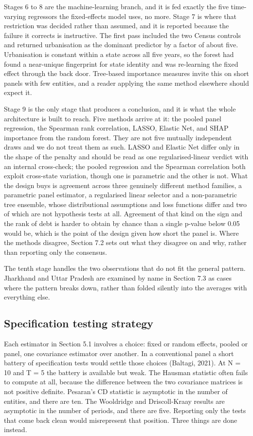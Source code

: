 \documentclass[12pt,a4paper]{article}
\begin{document}
Stages 6 to 8 are the machine-learning branch, and it is fed exactly the five time-varying regressors the fixed-effects model uses, no more. Stage 7 is where that restriction was decided rather than assumed, and it is reported because the failure it corrects is instructive. The first pass included the two Census controls and returned urbanisation as the dominant predictor by a factor of about five. Urbanisation is constant within a state across all five years, so the forest had found a near-unique fingerprint for state identity and was re-learning the fixed effect through the back door. Tree-based importance measures invite this on short panels with few entities, and a reader applying the same method elsewhere should expect it.

Stage 9 is the only stage that produces a conclusion, and it is what the whole architecture is built to reach. Five methods arrive at it: the pooled panel regression, the Spearman rank correlation, LASSO, Elastic Net, and SHAP importance from the random forest. They are not five mutually independent draws and we do not treat them as such. LASSO and Elastic Net differ only in the shape of the penalty and should be read as one regularised-linear verdict with an internal cross-check; the pooled regression and the Spearman correlation both exploit cross-state variation, though one is parametric and the other is not. What the design buys is agreement across three genuinely different method families, a parametric panel estimator, a regularised linear selector and a non-parametric tree ensemble, whose distributional assumptions and loss functions differ and two of which are not hypothesis tests at all. Agreement of that kind on the sign and the rank of debt is harder to obtain by chance than a single p-value below 0.05 would be, which is the point of the design given how short the panel is. Where the methods disagree, Section 7.2 sets out what they disagree on and why, rather than reporting only the consensus.

The tenth stage handles the two observations that do not fit the general pattern. Jharkhand and Uttar Pradesh are examined by name in Section 7.3 as cases where the pattern breaks down, rather than folded silently into the averages with everything else.

\subsection{Specification testing strategy}

Each estimator in Section 5.1 involves a choice: fixed or random effects, pooled or panel, one covariance estimator over another. In a conventional panel a short battery of specification tests would settle those choices (Baltagi, 2021). At N = 10 and T = 5 the battery is available but weak. The Hausman statistic often fails to compute at all, because the difference between the two covariance matrices is not positive definite. Pesaran's CD statistic is asymptotic in the number of entities, and there are ten. The Wooldridge and Driscoll-Kraay results are asymptotic in the number of periods, and there are five. Reporting only the tests that come back clean would misrepresent that position. Three things are done instead.
\end{document}
